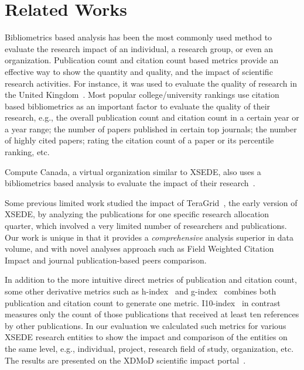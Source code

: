 \documentclass{sig-alternate}
\begin{document}
\section{Related Works} \label{S:related}

Bibliometrics based analysis has been the most commonly used method to
evaluate the research impact of an individual, a research group, or
even an organization. Publication count and citation count based
metrics provide an effective way to show the quantity and quality, and
the impact of scientific research activities. For instance, it was
used to evaluate the quality of research in the United
Kingdom~\cite{thomas1998institutional,penfield2014assessment}. Most
popular college/university rankings use citation based bibliometrics
as an important factor to evaluate the quality of their research,
e.g., the overall publication count and citation count in a certain
year or a year range; the number of papers published in certain top
journals; the number of highly cited papers; rating the citation count
of a paper or its percentile ranking, etc.

Compute Canada, a virtual organization similar to XSEDE, also uses a
bibliometrics based analysis to evaluate the impact of their
research~\cite{www-computecanada}.

Some previous limited work studied the impact of
TeraGrid~\cite{bollen2011and}, the early version of XSEDE, by
analyzing the publications for one specific research allocation
quarter, which involved a very limited number of researchers and
publications. Our work is unique in that it provides a {\em
  comprehensive} analysis superior in data volume, and with novel
analyses approach such as Field Weighted Citation Impact and journal
publication-based peers comparison.

In addition to the more intuitive direct metrics of publication and
citation count, some other derivative metrics such as
h-index~\cite{hirsch2005index} and g-index~\cite{egghe2006theory}
combines both publication and citation count to generate one
metric. I10-index~\cite {www-i10index} in contrast measures only the
count of those publications that received at least ten references by
other publications.  In our evaluation we calculated such metrics for
various XSEDE research entities to show the impact and comparison of
the entities on the same level, e.g., individual, project, research
field of study, organization, etc. The results are presented on the
XDMoD scientific impact portal~\cite{www-xdmod-sciimp}.
\end{document}
